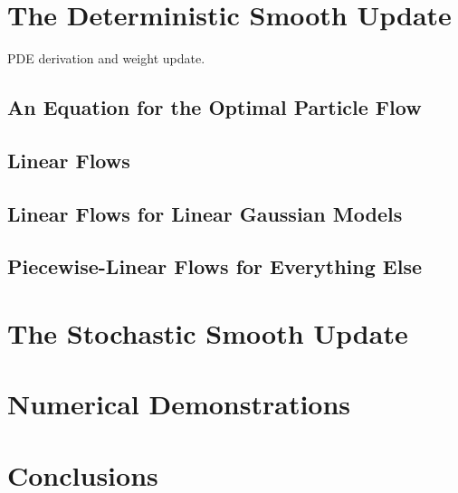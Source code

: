 \documentclass[a4paper,10pt]{article}
\begin{document}
\section{The Deterministic Smooth Update}{\meta PDE derivation and weight update.}
\subsection{An Equation for the Optimal Particle Flow}
\subsection{Linear Flows}
\subsection{Linear Flows for Linear Gaussian Models}
\subsection{Piecewise-Linear Flows for Everything Else}
\section{The Stochastic Smooth Update}
\section{Numerical Demonstrations}
\section{Conclusions}


%

\end{document}
